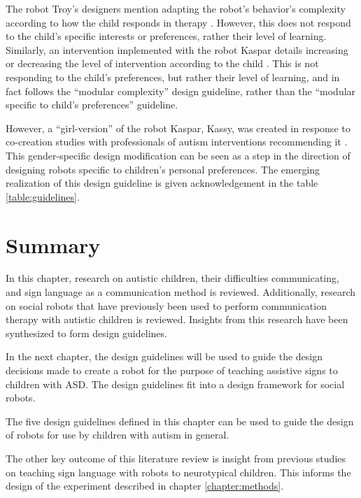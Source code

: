 The robot Troy's designers mention adapting the robot's behavior's complexity according to how the child responds in therapy \cite{giullian2010detailed}. However, this does not respond to the child's specific interests or preferences, rather their level of learning. Similarly, an intervention implemented with the robot Kaspar details increasing or decreasing the level of intervention according to the child \cite{huijnen2017implement}. This is not responding to the child's preferences, but rather their level of learning, and in fact follows the ``modular complexity'' design guideline, rather than the ``modular specific to child's preferences'' guideline.

However, a ``girl-version'' of the robot Kaspar, Kassy, was created in response to co-creation studies with professionals of autism interventions recommending it \cite{huijnen2017implement}. This gender-specific design modification can be seen as a step in the direction of designing robots specific to children's personal preferences. The emerging realization of this design guideline is given acknowledgement in the table \ref{table:guidelines}.


\section{Summary}

In this chapter, research on autistic children, their difficulties communicating, and sign language as a communication method is reviewed. Additionally, research on social robots that have previously been used to perform communication therapy with autistic children is reviewed. Insights from this research have been synthesized to form design guidelines.

In the next chapter, the design guidelines will be used to guide the design decisions made to create a robot for the purpose of teaching assistive signs to children with ASD. The design guidelines fit into a design framework for social robots.

The five design guidelines defined in this chapter can be used to guide the design of robots for use by children with autism in general. 

The other key outcome of this literature review is insight from previous studies on teaching sign language with robots to neurotypical children. This informs the design of the experiment described in chapter \ref{chapter:methods}. 

